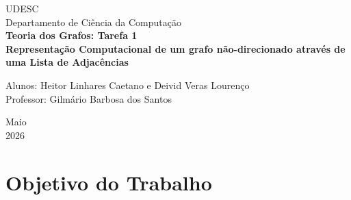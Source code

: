 \documentclass[a4paper, 12pt]{article}
\begin{document}

\begin{titlepage}
	\begin{center}
	

		\Huge{UDESC}\\
		\large{Departamento de Ciência da Computação}\\ 
		\vspace{15pt}
        \vspace{95pt}
        \textbf{\LARGE{Teoria dos Grafos: Tarefa 1}}\\

		\textbf{Representação Computacional de um grafo não-direcionado através de uma Lista de Adjacências}
		\vspace{3,5cm}
	\end{center}
	
	\begin{flushleft}
		\begin{tabbing}
			Alunos: Heitor Linhares Caetano e Deivid Veras Lourenço \\
			Professor: Gilmário Barbosa dos Santos \\
	      \setlength{\labelsep}{\leftmargin}
	\end{tabbing}
 \end{flushleft}
	\vspace{1cm}
	
	\begin{center}
		\vspace{\fill}
			 Maio\\
			 2026
			\end{center}
\end{titlepage}


\newpage
\newpage
\tableofcontents
\thispagestyle{empty}

\newpage
{}

\section{Objetivo do Trabalho}
\end{document}
